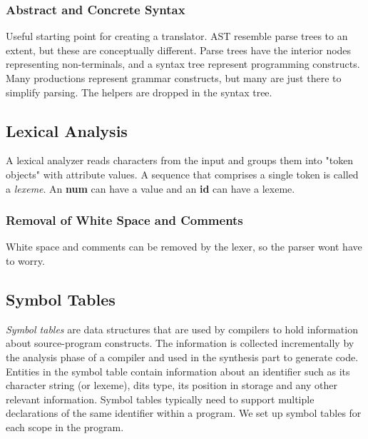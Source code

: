 \documentclass{article}
\begin{document}
\subsubsection{Abstract and Concrete Syntax} %
\label{ssub:Abstract and Concrete Syntax}
Useful starting point for creating a translator. AST resemble parse trees to an extent, but these are conceptually different. Parse trees have the interior nodes representing non-terminals, and a syntax tree represent programming constructs. Many productions represent grammar constructs, but many are just there to simplify parsing. The helpers are dropped in the syntax tree.

\subsection{Lexical Analysis} %
\label{sub:Lexical Analysis}
A lexical analyzer reads characters from the input and groups them into "token objects" with attribute values. A sequence that comprises a single token is called a \emph{lexeme}. An \textbf{num} can have a value and an \textbf{id} can have a lexeme.

\subsubsection{Removal of White Space and Comments} %
\label{ssub:Removal of White Space and Comments}
White space and comments can be removed by the lexer, so the parser wont have to worry.

\subsection{Symbol Tables} %
\label{sub:Symbol Tables}
\emph{Symbol tables} are data structures that are used by compilers to hold information about source-program constructs. The information is collected incrementally by the analysis phase of a compiler and used in the synthesis part to generate code. Entities in the symbol table contain information about an identifier such as its character string (or lexeme), dits type, its position in storage and any other relevant information. Symbol tables typically need to support multiple declarations of the same identifier within a program. We set up symbol tables for each scope in the program.
\end{document}
